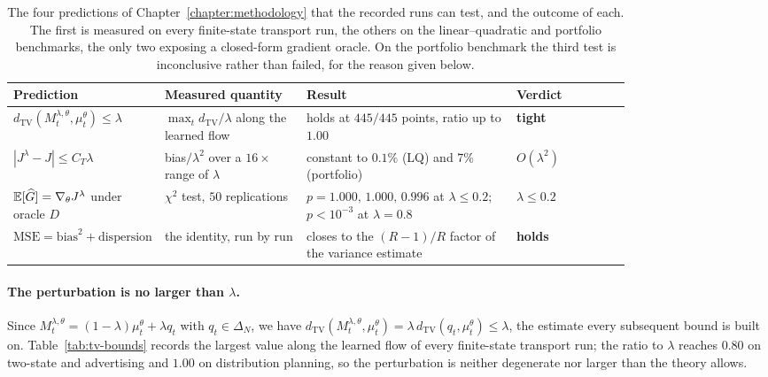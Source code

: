 \begin{table}[H]
\centering
\footnotesize
\setlength{\tabcolsep}{4pt}
\begin{tabular}{p{0.235\linewidth}p{0.235\linewidth}p{0.34\linewidth}l}
\toprule
Prediction & Measured quantity & Result & Verdict \\
\midrule
$d_{\mathrm{TV}}(M_t^{\lambda,\theta},\mu_t^\theta)\leq\lambda$
  & $\max_t d_{\mathrm{TV}}/\lambda$ along the learned flow
  & holds at $445/445$ points, ratio up to $1.00$
  & \textbf{tight} \\[4pt]
$|J^\lambda-J|\leq C_T\lambda$
  & bias$/\lambda^2$ over a $16\times$ range of $\lambda$
  & constant to $0.1\%$ (LQ) and $7\%$ (portfolio)
  & \textbf{$O(\lambda^2)$} \\[4pt]
$\mathbb{E}[\widehat G]=\nabla_\theta J^\lambda$ under oracle $D$
  & $\chi^2$ test, $50$ replications
  & $p=1.000,\,1.000,\,0.996$ at $\lambda\leq0.2$; $p<10^{-3}$ at $\lambda=0.8$
  & \textbf{$\lambda\leq0.2$} \\[4pt]
$\mathrm{MSE}=\mathrm{bias}^2+\mathrm{dispersion}$
  & the identity, run by run
  & closes to the $(R-1)/R$ factor of the variance estimate
  & \textbf{holds} \\
\bottomrule
\end{tabular}
\caption{The four predictions of Chapter~\ref{chapter:methodology} that the recorded runs can test, and the outcome of each. The first is measured on every finite-state transport run, the others on the linear--quadratic and portfolio benchmarks, the only two exposing a closed-form gradient oracle. On the portfolio benchmark the third test is inconclusive rather than failed, for the reason given below.}
\label{tab:theory-verdicts}
\end{table}

\paragraph{The perturbation is no larger than $\lambda$.}
Since $M_t^{\lambda,\theta}=(1-\lambda)\mu_t^\theta+\lambda q_t$ with $q_t\in\Delta_N$, we have $d_{\mathrm{TV}}(M_t^{\lambda,\theta},\mu_t^\theta)=\lambda\,d_{\mathrm{TV}}(q_t,\mu_t^\theta)\leq\lambda$, the estimate every subsequent bound is built on. Table~\ref{tab:tv-bounds} records the largest value along the learned flow of every finite-state transport run; the ratio to $\lambda$ reaches $0.80$ on two-state and advertising and $1.00$ on distribution planning, so the perturbation is neither degenerate nor larger than the theory allows.


